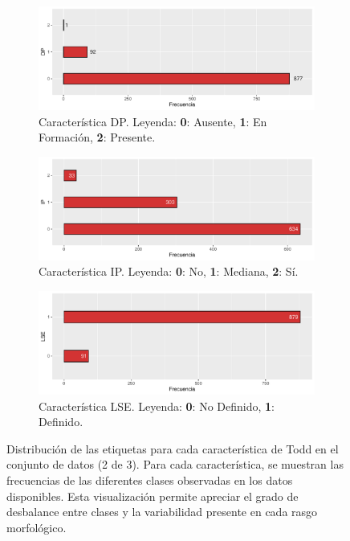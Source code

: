 \begin{figure}[p]

    \begin{subfigure}{\textwidth}
        \includegraphics[width=\linewidth]{../../scripts/eda/eda_univar/char_dp_distr.pdf}
        \caption{Característica DP. Leyenda: \textbf{0}: Ausente, \textbf{1}: En Formación, \textbf{2}: Presente.}
        \label{fig4:todd_chars__dp}
    \end{subfigure}

    \begin{subfigure}{\textwidth}
        \includegraphics[width=\linewidth]{../../scripts/eda/eda_univar/char_ip_distr.pdf}
        \caption{Característica IP. Leyenda: \textbf{0}: No, \textbf{1}: Mediana, \textbf{2}: Sí.}
        \label{fig4:todd_chars__ip}
    \end{subfigure}

    \begin{subfigure}{\textwidth}
        \includegraphics[width=\linewidth]{../../scripts/eda/eda_univar/char_lse_distr.pdf}
        \caption{Característica LSE. Leyenda: \textbf{0}: No Definido, \textbf{1}: Definido.}
        \label{fig4:todd_chars__lse}
    \end{subfigure}

    \caption[Distribución de las características de Todd (2 de 3)]{Distribución de las etiquetas para cada característica de Todd en el conjunto de datos (2 de 3). Para cada característica, se muestran las frecuencias de las diferentes clases observadas en los datos disponibles. Esta visualización permite apreciar el grado de desbalance entre clases y la variabilidad presente en cada rasgo morfológico.}
    \label{fig4:todd_chars_2}
\end{figure}
